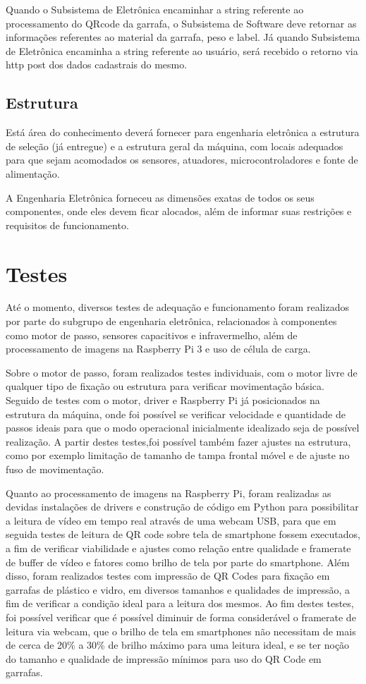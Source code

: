 Quando o Subsistema de Eletrônica encaminhar a string referente ao processamento do QRcode da garrafa, o Subsistema de Software deve retornar as informações referentes ao material da garrafa, peso e label. Já quando Subsistema de Eletrônica encaminha a string referente ao usuário, será recebido o retorno via http post dos dados cadastrais do mesmo. 

\subsection{Estrutura}
Está área do conhecimento deverá fornecer para engenharia eletrônica a estrutura de seleção (já entregue) e a estrutura geral da máquina, com locais adequados para que sejam acomodados os sensores, atuadores, microcontroladores e fonte de alimentação.

A Engenharia Eletrônica forneceu as dimensões exatas de todos os seus componentes, onde eles devem ficar alocados, além de informar suas restrições e requisitos de funcionamento.

\section{Testes}
Até o momento, diversos testes de adequação e funcionamento foram realizados por parte do subgrupo de engenharia eletrônica, relacionados à componentes como motor de passo, sensores capacitivos e infravermelho, além de processamento de imagens na Raspberry Pi 3 e uso de célula de carga.

Sobre o motor de passo, foram realizados testes individuais, com o motor livre de qualquer tipo de fixação ou estrutura para verificar movimentação básica. Seguido de testes com o motor, driver e Raspberry Pi já posicionados na estrutura da máquina, onde foi possível se verificar velocidade e quantidade de passos ideais para que o modo operacional inicialmente idealizado seja de possível realização. A partir destes testes,foi possível também fazer ajustes na estrutura, como por exemplo limitação de tamanho de tampa frontal móvel e de ajuste no fuso de movimentação.

Quanto ao processamento de imagens na Raspberry Pi, foram realizadas as devidas instalações de drivers e construção de código em Python para possibilitar a leitura de vídeo em tempo real através de uma webcam USB, para que em seguida testes de leitura de QR code sobre tela de smartphone fossem executados, a fim de verificar viabilidade e ajustes como relação entre qualidade e framerate de buffer de vídeo e fatores como brilho de tela por parte do smartphone. Além disso, foram realizados testes com impressão de QR Codes para fixação em garrafas de plástico e vidro, em diversos tamanhos e qualidades de impressão, a fim de verificar a condição ideal para a leitura dos mesmos. Ao fim destes testes, foi possível verificar que é possível diminuir de forma considerável o framerate de leitura via webcam, que o brilho de tela em smartphones não necessitam de mais de cerca de  20\% a 30\% de brilho máximo para uma leitura ideal, e se ter noção do tamanho e qualidade de impressão mínimos para uso do QR Code em garrafas.

